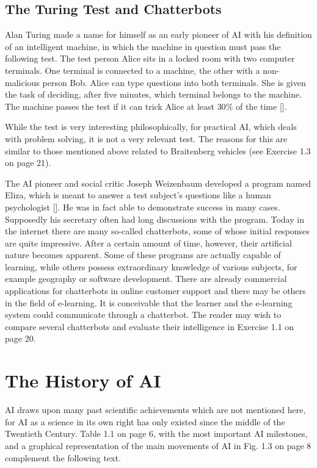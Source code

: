 \documentclass[10pt]{book}
\begin{document}
\subsection{The Turing Test and Chatterbots}
Alan Turing made a name for himself as an early pioneer of AI with his definition of an intelligent machine, in which the machine in question must pass the following test. The test person Alice sits in a locked room with two computer terminals. One terminal is connected to a machine, the other with a non-malicious person Bob. Alice can type questions into both terminals. She is given the task of deciding, after five minutes, which terminal belongs to the machine. The machine passes the test if it can trick Alice at least $30 \%$ of the time [\cite{turing1950computing}].

While the test is very interesting philosophically, for practical AI, which deals with problem solving, it is not a very relevant test. The reasons for this are similar to those mentioned above related to Braitenberg vehicles (see Exercise 1.3 on page 21).

The AI pioneer and social critic Joseph Weizenbaum developed a program named Eliza, which is meant to answer a test subject's questions like a human psychologist [\cite{weizenbaum1966eliza}]. He was in fact able to demonstrate success in many cases. Supposedly his secretary often had long discussions with the program. Today in the internet there are many so-called chatterbots, some of whose initial responses are quite impressive. After a certain amount of time, however, their artificial nature becomes apparent. Some of these programs are actually capable of learning, while others possess extraordinary knowledge of various subjects, for example geography or software development. There are already commercial applications for chatterbots in online customer support and there may be others in the field of e-learning. It is conceivable that the learner and the e-learning system could communicate through a chatterbot. The reader may wish to compare several chatterbots and evaluate their intelligence in Exercise 1.1 on page 20.

\section{The History of AI}
AI draws upon many past scientific achievements which are not mentioned here, for AI as a science in its own right has only existed since the middle of the Twentieth Century. Table 1.1 on page 6, with the most important AI milestones, and a graphical representation of the main movements of AI in Fig. 1.3 on page 8 complement the following text.
\end{document}
